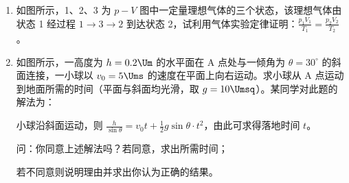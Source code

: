 \documentclass[\gkver]{gaokaozhenti}
\begin{document}
\begin{enumerate}
{（2）定值电阻的阻值 $R_{1}=250\UO$，两端电压为 $9\UV$，由欧姆定律可以算出流过定值电阻 $R_{1}$ 的电流为 $36\UmA$，故流过热敏电阻的电流为 $34\UmA$，由图线查出这时热敏电阻两端的电压为 $5.2\UV$，那么电阻 $R_{2}$ 两端的电压为 $3.8\UV$，结合电流可以算出它的电阻约为 $111.8\UO$。

（3）可用于制作热敏温度计及温控敏感元件等。
}

\item
如图所示，1、2、3 为 $p-V$ 图中一定量理想气体的三个状态，该理想气体由状态 1 经过程 $1\to3\to2$ 到达状态 2，试利用气体实验定律证明：$\frac{p_{1}V_{1}}{T_{1}}=\frac{p_{2}V_{2}}{T_{2}}$。

\onepicture[align=right, h=3.52cm]{}


\item
如图所示，一高度为 $h=0.2\Um$ 的水平面在 A 点处与一倾角为 $\theta=30^{\circ}$ 的斜面连接，一小球以 $v_{0}=5\Ums$ 的速度在平面上向右运动。求小球从 A 点运动到地面所需的时间（平面与斜面均光滑，取 $g=10\Umsq$）。某同学对此题的解法为：

小球沿斜面运动，则 $\frac{h}{\sin\theta}=v_{0}t+\frac{1}{2}g\sin\theta\cdot t^{2}$，由此可求得落地时间 $t$。

问：你同意上述解法吗？若同意，求出所需时间；

若不同意则说明理由并求出你认为正确的结果。

\onepicture[align=right, w=6.12cm]{}

\end{enumerate}
\end{document}
